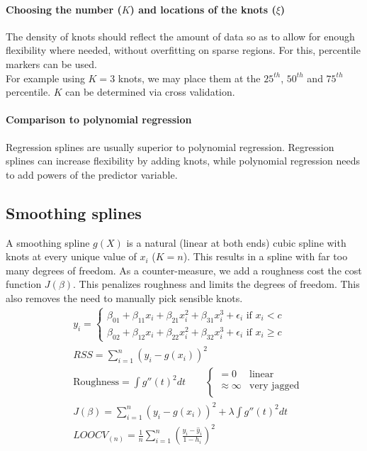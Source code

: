 \documentclass[../document.tex]{subfiles}
\begin{document}
	\paragraph{Choosing the number ($K$) and locations of the knots ($\xi$)}
	The density of knots should reflect the amount of data so as to allow for enough flexibility where needed, without overfitting on sparse regions. For this, percentile markers can be used.\\
	For example using $K=3$ knots, we may place them at the $25^{th}$, $50^{th}$ and $75^{th}$ percentile. $K$ can be determined via cross validation.

	\paragraph{Comparison to polynomial regression}
	Regression splines are usually superior to polynomial regression. Regression splines can increase flexibility by adding knots, while polynomial regression needs to add powers of the predictor variable.

	\subsection{Smoothing splines}
	A smoothing spline $g(X)$ is a natural (linear at both ends) cubic spline with knots at every unique value of $x_{i}$ ($K=n$). This results in a spline with far too many degrees of freedom. As a counter-measure, we add a roughness cost the cost function $J(\beta)$. This penalizes roughness and limits the degrees of freedom. This also removes the need to manually pick sensible knots.
	\begin{equation}
	\begin{split}
		&y_{i}=\begin{cases}
			\beta_{01}+\beta_{11}x_{i}+\beta_{21}x_{i}^2+\beta_{31}x_{i}^3+\epsilon_{i} \text{  if  } x_{i} < c\\
			\beta_{02}+\beta_{12}x_{i}+\beta_{22}x_{i}^2+\beta_{32}x_{i}^3+\epsilon_{i} \text{  if  } x_{i} \geq c
		\end{cases}\\
		&RSS=\sum_{i=1}^{n}(y_{i}-g(x_{i}))^2\\
		&\text{Roughness} = \int g''(t)^2dt \qquad \begin{cases}
			=0 & \text{linear}\\
			\approx \infty & \text{very jagged}\\
		\end{cases}\\
		&J(\beta)=\sum_{i=1}^{n}(y_{i}-g(x_{i}))^2+\lambda\int g''(t)^2dt\\
		&LOOCV_{(n)}=\frac{1}{n}\sum_{i=1}^{n}(\frac{y_{i}-\hat{y}_{i}}{1-h_{i}})^2\\
	\end{split}
	\end{equation}
\end{document}
